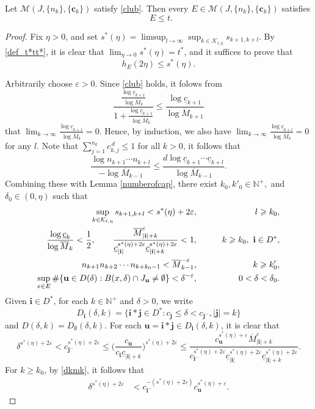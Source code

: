 \documentclass[10pt,a4paper]{amsart}
\DeclareMathOperator{\dimqa}{dim_{qA}}
\newcommand{\N}{\mathbb{N}}
\newcommand{\bu}{\mathbf{u}}
\newcommand{\ccc}{\mathbf{c}}
\newcommand{\de}{\delta}
\newcommand{\eps}{\varepsilon}
\newcommand{\f}{\frac}
\newcommand{\iii}{\mathbf{i}}
\newcommand{\jjj}{\mathbf{j}}
\newcommand{\kk}{\mathcal{K}}
\newcommand{\om}{\overline{M}}
\newcommand{\uc}{\underline{c}}
\renewcommand{\ge}{\geqslant}
\renewcommand{\leq}{\leqslant}
\renewcommand{\le}{\leqslant}
\begin{document}
	\begin{theorem}\label{xiaoyu}
		Let $ \mathcal{M}(J,\{n_k\},\{\ccc_k\})$ satisfy \eqref{club}. Then every  $E\in\mathcal{M}(J,\{n_k\},\{\ccc_k\})$ satisfies
		\[
		\dimqa E\le t.
		\]
	\end{theorem}

	\begin{proof}%
		Fix $\eta>0$, and  set  $s^{*}(\eta)=\limsup_{l\to\infty}\sup_{k\in \kk_{l,\eta}} s_{k+1,k+l}$. By \eqref{def_t*tt*}, it is clear that $\lim_{\eta \to 0} s^{*}(\eta)=t^*$,  and it suffices to prove that
		\[
		h_E(2\eta)\le s^*(\eta).
		\]
		
		Arbitrarily choose $\eps>0$.	Since \eqref{club} holds, it folows from
		\[
		\f{\f{\log \uc_{k+1}}{\log \om_k}}{1+\f{\log \uc_{k+1}}{\log \om_k}}\le\f{\log \uc_{k+1}}{\log \om_{k+1}}
		\]
		 that $\lim_{k\to\infty}\f{\log \uc_{k+1}}{\log \om_k}=0$. Hence, by induction, we also have $\lim_{k\to\infty}\f{\log \uc_{k+l}}{\log \om_k}=0$ for any $l$.   Note that  $\sum
		_{j=1}^{n_{k}}c_{k,j}^{\,d}\leq 1$ for all $k>0$, it follows that
		\[
		\f{\log n_{k+1}\cdots n_{k+l}}{-\log \om_{k-1}}\le\f{d\log \uc_{k+1}\cdots \uc_{k+l}}{\log \om_{k-1}} .
		\]
Combining these with  Lemma \ref{numberofcap},
		there exist $k_0, k'_0 \in {\N}^+,$ and $\de_0\in (0,\eta)$ such that
		\begin{eqnarray}
			\sup_{k\in \kk_{l,\eta}} s_{k+1,k+l}<s^*(\eta)+2\eps, \qquad &&l\ge k_0,\label{sk}   \\
			\f{\log \uc_k}{\log \om_k}<\frac{1}{2},\qquad  \frac{\om_{|\iii|+k}^{\eps}}{\uc_{|\iii|}^{s^*(\eta)+2\eps}\uc_{|\iii|+k}^{s^*(\eta)+2\eps}}<1,\qquad && k\ge k_0,\ \iii\in D^*,\vspace{0.5em}\label{dkmk}\\
			n_{k+1}n_{k+2}\cdots n_{k+k_0-1}<\om_{k-1}^{- {\eps}},\qquad &&k\ge k'_0,\label{nk}\vspace{0.2em}\\
			\sup_{x\in E}\#\{\bu\in D(\delta):B(x,\de)\cap J_{\bu}\neq \emptyset\}<\de^{-{\eps}},\qquad &&0<\de<\de_0.\label{numberofcut'}
		\end{eqnarray}
		Given $\iii\in D^*$, for each $k\in{\N}^+$ and $\delta>0$, we write
		\[
		D_{\iii}(\de,k)=\{\iii*\jjj\in D^*:c_{\jjj}\le \de<c_{\jjj^-},|\jjj|=k\}
		\]
		and $D(\de,k)=D_{\emptyset}(\de,k)$. For each $\bu=\iii*\jjj\in D_{\iii}(\de,k)$, it is clear that
		$$
		\de^{s^*(\eta)+2\eps}< c_{\jjj^-}^{s^*(\eta)+2\eps} \leq \Big(\frac{c_{\bu}}{c_{\iii}\uc_{|\iii|+k}}\Big)^{s^*(\eta)+2\eps} \le  \frac{c_{\bu}^{s^*(\eta)+\eps}\om_{|\iii|+k}^{\eps}}{c_{\iii^-}^{s^*(\eta)+2\eps}\uc_{|\iii|}^{s^*(\eta)+2\eps}\uc_{|\iii|+k}^{s^*(\eta)+2\eps}}.
		$$
		For $k\ge k_0$,  by \eqref{dkmk}, it follows that
		\begin{equation}\label{estdelta1}
			\begin{aligned}
				\de^{s^*(\eta)+2\eps}&< {c_{\iii^-}^{-(s^*(\eta)+2\eps)}}  c_{\bu}^{s^*(\eta)+\eps} .
			\end{aligned}
		\end{equation}
		

\end{proof}
\end{document}
